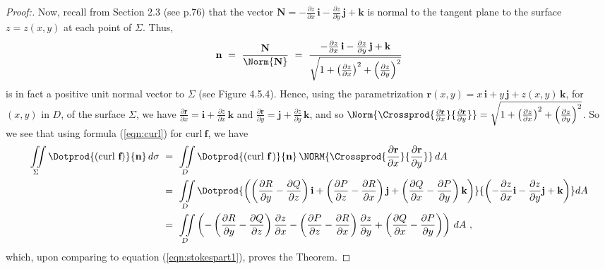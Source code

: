 \begin{proof}[Proof:]
 Now, recall from Section 2.3 (see p.76) that the vector $\textbf{N} = -\frac{\partial z}{\partial x}\,\textbf{i} -
 \frac{\partial z}{\partial y}\,\textbf{j} + \textbf{k}$ is normal to the tangent plane to the surface $z=z(x,y)$ at
 each point of $\Sigma$. Thus,
 \begin{displaymath}
  \textbf{n} ~=~ \frac{\textbf{N}}{\Norm{\textbf{N}}} ~=~
   \frac{-\frac{\partial z}{\partial x}\,\textbf{i} - \frac{\partial z}{\partial y}\,\textbf{j} +
   \textbf{k}}{\sqrt{1 + \left( \tfrac{\partial z}{\partial x} \right)^2 +
   \left( \tfrac{\partial z}{\partial y} \right)^2}}
 \end{displaymath}
 is in fact a positive unit normal vector to $\Sigma$ (see Figure 4.5.4). Hence, using the parametrization
 $\textbf{r}(x,y) = x\,\textbf{i} + y\,\textbf{j} + z(x,y)\,\textbf{k}$, for $(x,y)$ in $D$, of the surface $\Sigma$,
 we have $\frac{\partial \textbf{r}}{\partial x} = \textbf{i} + \frac{\partial z}{\partial x}\,\textbf{k}$ and
 $\frac{\partial \textbf{r}}{\partial y} = \textbf{j} + \frac{\partial z}{\partial y}\,\textbf{k}$, and so
 $\Norm{\Crossprod{\frac{\partial \textbf{r}}{\partial x}}{\frac{\partial \textbf{r}}{\partial y}}} =
   \sqrt{1 + \left( \tfrac{\partial z}{\partial x} \right)^2 + \left( \tfrac{\partial z}{\partial y} \right)^2}$.
 So we see that using formula (\ref{eqn:curl}) for $\text{curl}~{\textbf{f}}$, we have
 \begin{align*}
  \iint\limits_{\Sigma} \Dotprod{(\text{curl}~{\textbf{f}})}{\textbf{n}}\,d\sigma ~&=~
   \iint\limits_{D} \Dotprod{(\text{curl}~{\textbf{f}}\,)}{\textbf{n}}\,
   \NORM{\Crossprod{\frac{\partial \textbf{r}}{\partial x}}{\frac{\partial \textbf{r}}{\partial y}}}\,dA\\
   &=~ \iint\limits_{D} \Dotprod{\left( \left( \frac{\partial R}{\partial y} - \frac{\partial Q}{\partial z} \right)
    \textbf{i} + \left( \frac{\partial P}{\partial z} - \frac{\partial R}{\partial x} \right) \textbf{j} +
    \left( \frac{\partial Q}{\partial x} - \frac{\partial P}{\partial y} \right) \textbf{k}
    \right)}{\left( -\frac{\partial z}{\partial x}\textbf{i} - \frac{\partial z}{\partial y}\textbf{j} +
    \textbf{k} \right)} dA\\
   &=~ \iint\limits_{D} \left(
    -\left( \frac{\partial R}{\partial y} - \frac{\partial Q}{\partial z} \right) \frac{\partial z}{\partial x}
    -\left( \frac{\partial P}{\partial z} - \frac{\partial R}{\partial x} \right) \frac{\partial z}{\partial y}
    + \left( \frac{\partial Q}{\partial x} - \frac{\partial P}{\partial y} \right) \right)\,dA ~,
 \end{align*}
 which, upon comparing to equation (\ref{eqn:stokespart1}), proves the Theorem.
 \vspace{-3mm}
\end{proof}


